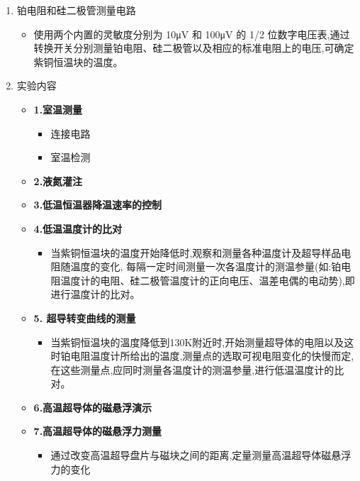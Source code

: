 \documentclass[12pt, a4paper]{article}
\begin{document}
\begin{enumerate}
\begin{itemize}
        \end{itemize}
     \item 铂电阻和硅二极管测量电路
        \begin{itemize}
            \item 使用两个内置的灵敏度分别为 10μV 和 100μV 的 1/2 位数字电压表,通过转换开关分别测量铂电阻、硅二极管以及相应的标准电阻上的电压,可确定紫铜恒温块的温度。
        \end{itemize}
        \item 实验内容
         \begin{itemize}
            \item \textbf{1.室温测量}
                 \begin{itemize}
                     \item 连接电路
                     \item 室温检测
                  \end{itemize}
            \item  \textbf{2.液氮灌注}
            \item  \textbf{3.低温恒温器降温速率的控制}
            \item  \textbf{4.低温温度计的比对}
               \begin{itemize}
                  \item 当紫铜恒温块的温度开始降低时,观察和测量各种温度计及超导样品电阻随温度的变化, 每隔一定时间测量一次各温度计的测温参量(如:铂电阻温度计的电阻、硅二极管温度计的正向电压、温差电偶的电动势),即进行温度计的比对。
               \end{itemize}
            \item \textbf{5. 超导转变曲线的测量}
               \begin{itemize}
                  \item 当紫铜恒温块的溫度降低到130K附近时,开始测量超导体的电阻以及这时铂电阻温度计所给出的温度,测量点的选取可视电阻变化的快慢而定,在这些测量点,应同时测量各温度计的测温参量,进行低温温度计的比对。
               \end{itemize}
            \item \textbf{6.高温超导体的磁悬浮演示}
            \item \textbf{7.高温超导体的磁悬浮力测量}
               \begin{itemize}
                   \item 通过改变高温超导盘片与磁块之间的距离,定量测量高温超导体磁悬浮力的变化
               \end{itemize}
        \end{itemize}
\end{enumerate}
\end{document}
